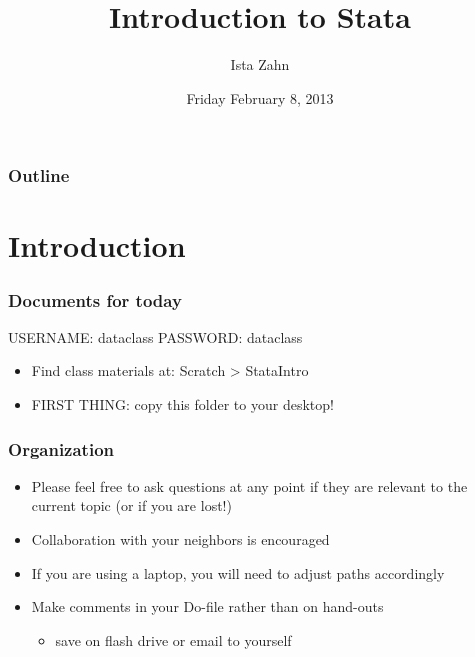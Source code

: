 \documentclass[table]{beamer}
\institute{IQSS}
\title{Introduction to Stata}
\author{Ista Zahn}
\date{Friday February 8, 2013 }
\begin{document}
\maketitle

\begin{frame}
\frametitle{Outline}
\setcounter{tocdepth}{2}
\tableofcontents
\end{frame}







\section{Introduction}
\label{sec-1}
\begin{frame}
\frametitle{Documents for today}
\label{sec-1-1}

USERNAME: dataclass
PASSWORD: dataclass
\begin{itemize}
\item Find class materials at:  Scratch > StataIntro
\item FIRST THING: copy this folder to your desktop!
\end{itemize}
\end{frame}
\begin{frame}
\frametitle{Organization}
\label{sec-1-2}

\begin{itemize}
\item Please feel free to ask questions at any point if they are relevant to the current topic (or if you are lost!)
\end{itemize}
\begin{itemize}
\item Collaboration with your neighbors is encouraged
\item If you are using a laptop, you will need to adjust paths accordingly
\item Make comments in your Do-file rather than on hand-outs
\begin{itemize}
\item save on flash drive or email to yourself
\end{itemize}
\end{itemize}
\end{frame}
\end{document}
